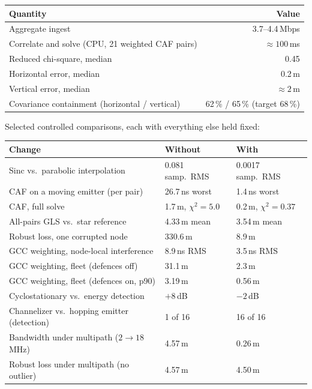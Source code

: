 \documentclass[11pt,a4paper]{article}
\begin{document}
\begin{center}
\begin{tabular}{@{}lr@{}}
\toprule
\textbf{Quantity} & \textbf{Value}\\
\midrule
Aggregate ingest                          & 3.7--4.4\,Mbps\\
Correlate and solve (CPU, 21 weighted CAF pairs) & $\approx100$\,ms\\
Reduced chi-square, median                & 0.45\\
Horizontal error, median                  & 0.2\,m\\
Vertical error, median                    & $\approx2$\,m\\
Covariance containment (horizontal / vertical) & 62\,\% / 65\,\% (target 68\,\%)\\
\bottomrule
\end{tabular}
\end{center}

Selected controlled comparisons, each with everything else held fixed:

\begin{center}
\begin{tabular}{@{}lll@{}}
\toprule
\textbf{Change} & \textbf{Without} & \textbf{With}\\
\midrule
Sinc vs.\ parabolic interpolation & 0.081 samp.\ RMS & 0.0017 samp.\ RMS\\
CAF on a moving emitter (per pair) & 26.7\,ns worst & 1.4\,ns worst\\
CAF, full solve                    & 1.7\,m, $\chi^2\!=\!5.0$ & 0.2\,m, $\chi^2\!=\!0.37$\\
All-pairs GLS vs.\ star reference  & 4.33\,m mean & 3.54\,m mean\\
Robust loss, one corrupted node    & 330.6\,m & 8.9\,m\\
GCC weighting, node-local interference & 8.9\,ns RMS & 3.5\,ns RMS\\
GCC weighting, fleet (defences off)    & 31.1\,m & 2.3\,m\\
GCC weighting, fleet (defences on, p90)& 3.19\,m & 0.56\,m\\
Cyclostationary vs.\ energy detection  & $+8$\,dB & $-2$\,dB\\
Channelizer vs.\ hopping emitter (detection) & 1 of 16 & 16 of 16\\
Bandwidth under multipath ($2\to18$\,MHz) & 4.57\,m & 0.26\,m\\
Robust loss under multipath (no outlier) & 4.57\,m & 4.50\,m\\
\bottomrule
\end{tabular}
\end{center}
\end{document}
